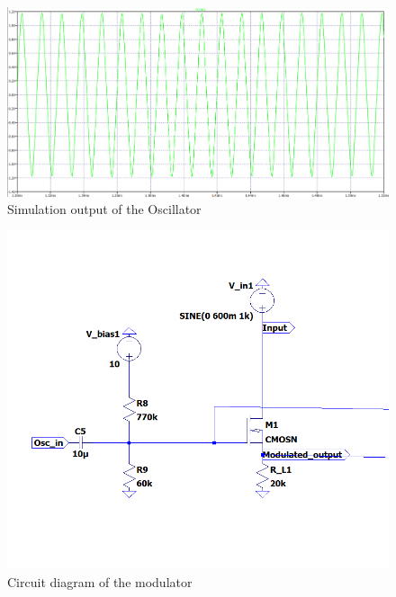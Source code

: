 \documentclass[conference]{IEEEtran}
\begin{document}
\begin{figure}
    \centering
    \includegraphics[width=1\linewidth]{Images/Osc_simulation.png}
    \caption{Simulation output of the Oscillator}
\end{figure}

\begin{figure}
    \centering
    \includegraphics[width=1\linewidth]{Images/Modulator_ltspice.png}
    \caption{Circuit diagram of the modulator}
\end{figure}
\end{document}
